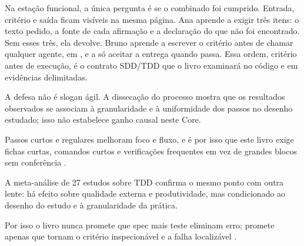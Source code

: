 Na esta\c{c}\~ao funcional, a \'unica pergunta \'e se o combinado foi cumprido. Entrada, crit\'erio e sa\'ida ficam vis\'iveis na mesma p\'agina. Ana aprende a exigir tr\^es itens: o texto pedido, a fonte de cada afirma\c{c}\~ao e a declara\c{c}\~ao do que n\~ao foi encontrado. Sem esses tr\^es, ela devolve. Bruno aprende a escrever o crit\'erio antes de chamar qualquer agente, em , e a s\'o aceitar a entrega quando  passa. Essa ordem, crit\'erio antes de execu\c{c}\~ao, \'e o contrato SDD/TDD que o livro examinar\'a no c\'odigo e em evid\^encias delimitadas.

A defesa n\~ao \'e slogan \'agil. A disseca\c{c}\~ao do processo mostra que os resultados observados se associam \`a granularidade e \`a uniformidade dos passos no desenho estudado; isso n\~ao estabelece ganho causal neste Core.

Passos curtos e regulares melhoram foco e fluxo, e \'e por isso que este livro exige fichas curtas, comandos curtos e verifica\c{c}\~oes frequentes em vez de grandes blocos sem confer\^encia .

A meta-an\'alise de 27 estudos sobre TDD confirma o mesmo ponto com outra lente: h\'a efeito sobre qualidade externa e produtividade, mas condicionado ao desenho do estudo e \`a granularidade da pr\'atica.

Por isso o livro nunca promete que spec mais teste eliminam erro; promete apenas que tornam o crit\'erio inspecion\'avel e a falha localiz\'avel .


